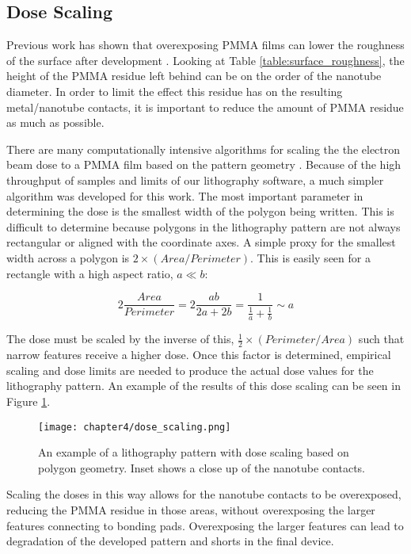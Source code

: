\subsection{Dose Scaling}

Previous work has shown that overexposing PMMA films can lower the roughness of the surface after development \cite{Macintyre2009, Aurich2012}. Looking at Table \ref{table:surface_roughness}, the height of the PMMA residue left behind can be on the order of the nanotube diameter. In order to limit the effect this residue has on the resulting metal/nanotube contacts, it is important to reduce the amount of PMMA residue as much as possible.

There are many computationally intensive algorithms for scaling the the electron beam dose to a PMMA film based on the pattern geometry \cite{Eisenmann1993, Stirniman1994, Soe2000, Osawa2001}. Because of the high throughput of samples and limits of our lithography software, a much simpler algorithm was developed for this work. The most important parameter in determining the dose is the smallest width of the polygon being written. This is difficult to determine because polygons in the lithography pattern are not always rectangular or aligned with the coordinate axes. A simple proxy for the smallest width across a polygon is $2\times(Area/Perimeter)$. This is easily seen for a rectangle with a high aspect ratio, $a \ll b$:

\begin{equation}
    \label{eq:dose_scaling}
    2\frac{Area}{Perimeter} = 2\frac{ab}{2a+2b} = \frac{1}{\frac{1}{a}+\frac{1}{b}} \sim a
\end{equation}

The dose must be scaled by the inverse of this, $\frac{1}{2}\times(Perimeter/Area)$ such that narrow features receive a higher dose. Once this factor is determined, empirical scaling and dose limits are needed to produce the actual dose values for the lithography pattern. An example of the results of this dose scaling can be seen in Figure \ref{fig:dose_scaling}.

\begin{figure}
    \centering
    \texttt{[image: chapter4/dose\_scaling.png]}
    \caption{An example of a lithography pattern with dose scaling based on polygon geometry. Inset shows a close up of the nanotube contacts.}
    \label{fig:dose_scaling}
\end{figure}

Scaling the doses in this way allows for the nanotube contacts to be overexposed, reducing the PMMA residue in those areas, without overexposing the larger features connecting to bonding pads. Overexposing the larger features can lead to degradation of the developed pattern and shorts in the final device.

